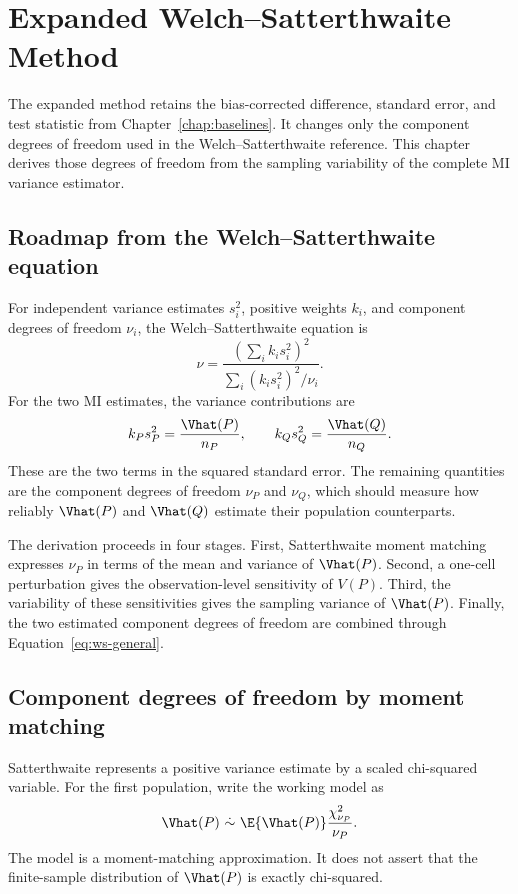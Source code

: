\chapter{Expanded Welch--Satterthwaite Method}
\label{chap:expanded}

The expanded method retains the bias-corrected difference, standard error, and
test statistic from Chapter~\ref{chap:baselines}. It changes only the component
degrees of freedom used in the Welch--Satterthwaite reference. This chapter
derives those degrees of freedom from the sampling variability of the complete
MI variance estimator.

\section{Roadmap from the Welch--Satterthwaite equation}

For independent variance estimates \(s_i^2\), positive weights \(k_i\), and
component degrees of freedom \(\nu_i\), the Welch--Satterthwaite equation is
\begin{equation}
  \nu
  =
  \frac{
  \left(\sum_i k_i s_i^2\right)^2
  }{
  \sum_i(k_i s_i^2)^2/\nu_i
  }.
  \label{eq:ws-general}
\end{equation}
For the two MI estimates, the variance contributions are
\begin{equation}
  k_Ps_P^2=\frac{\Vhat(P)}{n_P},
  \qquad
  k_Qs_Q^2=\frac{\Vhat(Q)}{n_Q}.
  \label{eq:ws-mi-components}
\end{equation}
These are the two terms in the squared standard error. The remaining quantities
are the component degrees of freedom \(\nu_P\) and \(\nu_Q\), which should
measure how reliably \(\Vhat(P)\) and \(\Vhat(Q)\) estimate their population
counterparts.

The derivation proceeds in four stages. First, Satterthwaite moment matching
expresses \(\nu_P\) in terms of the mean and variance of \(\Vhat(P)\). Second,
a one-cell perturbation gives the observation-level sensitivity of \(V(P)\).
Third, the variability of these sensitivities gives the sampling variance of
\(\Vhat(P)\). Finally, the two estimated component degrees of freedom are
combined through Equation~\eqref{eq:ws-general}.

\section{Component degrees of freedom by moment matching}

Satterthwaite represents a positive variance estimate by a scaled chi-squared
variable. For the first population, write the working model as
\begin{equation}
  \Vhat(P)
  \ \dot\sim\
  \E\{\Vhat(P)\}
  \frac{\chi^2_{\nu_P}}{\nu_P}.
  \label{eq:scaled-chi-working}
\end{equation}
The model is a moment-matching approximation. It does not assert that the
finite-sample distribution of \(\Vhat(P)\) is exactly chi-squared.

